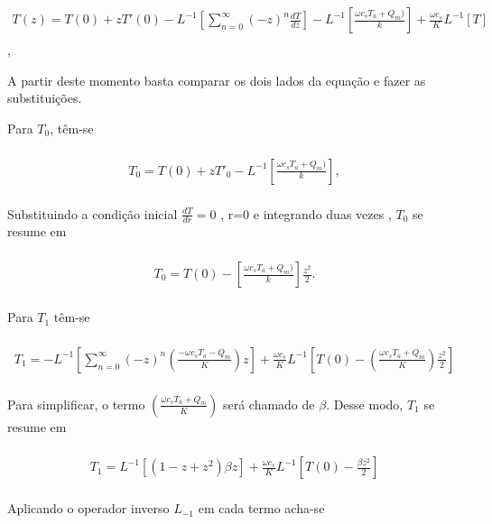\begin{gather} \nonumber\\
T(z)  = T(0) + zT'(0) -L^{-1} \left[\sum_{n=0}^{\infty} (-z)^{n}\frac{dT}{dz}\right] - L^{-1}\left[\frac{\omega c_{s}T_{a} + Q_{m} )}{k}\right] + \frac{\omega c_s}{K}L^{-1}[T]\nonumber\\\end{gather},

A partir deste momento basta comparar os dois lados da equação e fazer as substituições.

Para $T_{0}$, têm-se

\begin{gather} \nonumber\\
T_{0} = T(0) + zT'_{0} - L^{-1}\left[\frac{\omega c_{s}T_{a} + Q_{m} )}{k}\right],
\nonumber\\\end{gather}

Substituindo a condição inicial $\frac{dT}{dr} = 0$ , r=0   e integrando duas vezes , $T_{0}$ se resume em


\begin{gather} \nonumber\\
T_{0} = T(0) - \left[\frac{\omega c_{s}T_{a} + Q_{m} )}{k}\right]\frac{z^{2}}{2}.
\nonumber\\\end{gather}

Para $T_{1}$ têm-se


\begin{gather} \nonumber\\
T_{1} = -L^{-1} \left[\sum_{n=0}^{\infty} (-z)^{n}\left(\frac{-\omega c_{s} T_{a} - Q_{m}}{K}\right)z\right] + \frac{\omega c_{s}}{K}L^{-1}\left[T(0) - \left(\frac{\omega c_{s} T_{a}+Q_{m}}{K}\right)\frac{z^{2}}{2}\right]
\nonumber\\\end{gather}

Para simplificar, o termo $\left(\frac{\omega c_{s} T_{a} + Q_{m}}{K}\right)$ será chamado de $\beta$. Desse modo, $T_{1}$ se resume em


\begin{gather} \nonumber\\
T_{1} = L^{-1} \left[(1 - z + z^{2}) \beta z\right] + \frac{\omega c_{s}}{K} L^{-1} \left[T(0) - \frac{\beta z^{2}}{2}\right]
\nonumber\\\end{gather}

Aplicando o operador inverso $L_{-1}$ em cada termo acha-se

